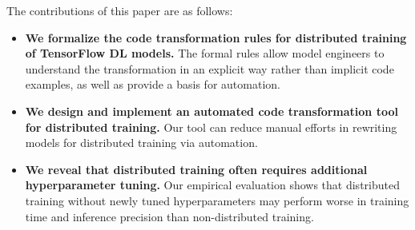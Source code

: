 The contributions of this paper are as follows:

\begin{itemize}
  \item {\bf We formalize the code transformation rules for distributed
    training of TensorFlow DL models.} The formal rules allow model engineers
    to understand the transformation in an explicit way rather than implicit
    code examples, as well as provide a basis for automation. 

  \item {\bf We design and implement an automated code transformation tool for
    distributed training.} Our tool can reduce manual efforts in rewriting
    models for distributed training via automation.

  \item {\bf We reveal that distributed training often requires additional
    hyperparameter tuning.} 
    Our empirical evaluation shows that distributed training without newly
    tuned hyperparameters may perform worse in training time and inference
    precision than non-distributed training.
\end{itemize}
